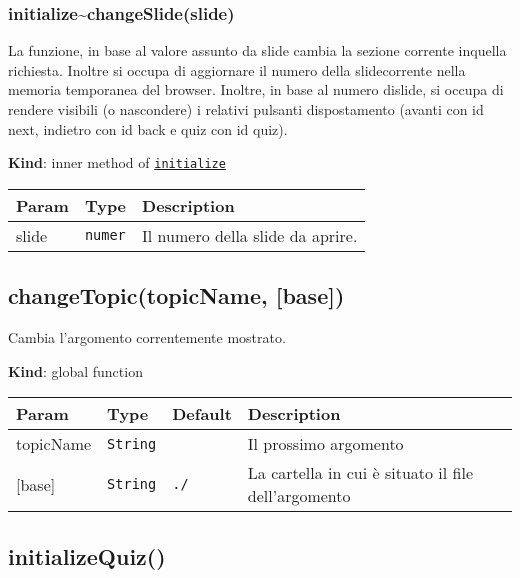 \protect\hypertarget{initialize..changeSlide}{}{}

\hypertarget{initializechangeslideslide}{%
\subsubsection{initialize\textasciitilde changeSlide(slide)}\label{initializechangeslideslide}}

La funzione, in base al valore assunto da slide cambia la sezione
corrente inquella richiesta. Inoltre si occupa di aggiornare il numero
della slidecorrente nella memoria temporanea del browser. Inoltre, in
base al numero dislide, si occupa di rendere visibili (o nascondere) i
relativi pulsanti dispostamento (avanti con id next, indietro con id
back e quiz con id quiz).

\textbf{Kind}: inner method of
\protect\hyperlink{initialize}{\texttt{initialize}}

\begin{tabularx}{\textwidth}{XXX}
\toprule
Param & Type & Description\tabularnewline
\midrule
\endhead
slide & \texttt{numer} & Il numero della slide da aprire.\tabularnewline
\bottomrule
\end{tabularx}

\protect\hypertarget{changeTopic}{}{}

\hypertarget{changetopictopicname-base}{%
\subsection{changeTopic(topicName,
{[}base{]})}\label{changetopictopicname-base}}

Cambia l'argomento correntemente mostrato.

\textbf{Kind}: global function

\begin{tabularx}{\textwidth}{XXXX}
\toprule
Param & Type & Default & Description\tabularnewline
\midrule
\endhead
topicName & \texttt{String} & & Il prossimo argomento\tabularnewline
{[}base{]} & \texttt{String} & \texttt{./} & La cartella in cui è
situato il file dell'argomento\tabularnewline
\bottomrule
\end{tabularx}

\protect\hypertarget{initializeQuiz}{}{}

\hypertarget{initializequiz}{%
\subsection{initializeQuiz()}\label{initializequiz}}

